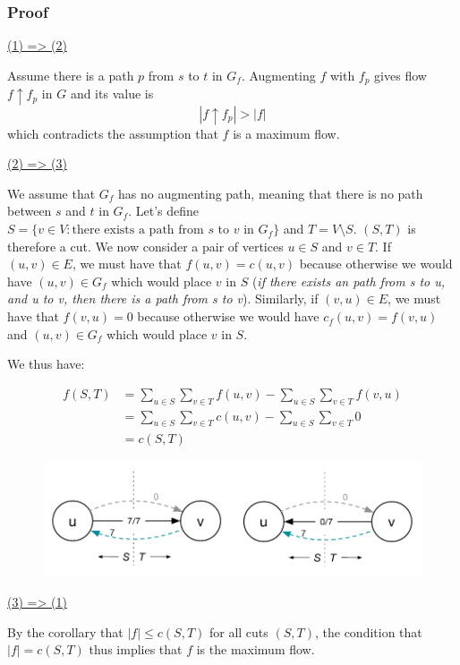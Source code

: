 \documentclass[12pt]{article}
\begin{document}
\subsubsection*{\color{red}Proof}

\underline{(1) => (2)}

Assume there is a path $p$ from $s$ to $t$ in $G_f$. Augmenting $f$ with $f_p$ gives flow $f \uparrow f_p$ in $G$ and its value is $$|f \uparrow f_p| > |f|$$ which contradicts the assumption that $f$ is a maximum flow.

\underline{(2) => (3)}

We assume that $G_f$ has no augmenting path, meaning that there is no path between $s$ and $t$ in $G_f$. Let's define $S = \{v \in V : \text{there exists a path from } s \text{ to } v \text{ in } G_f\}$ and $T = V \setminus S$. $(S,T)$ is therefore a cut. We now consider a pair of vertices $u \in S$ and $v \in T$. If $(u,v) \in E$, we must have that $f(u,v) = c(u,v)$ because otherwise we would have $(u,v) \in G_f$ which would place $v$ in $S$ (\textit{if there exists an path from s to u, and u to v, then there is a path from s to v}). Similarly, if $(v,u) \in E$, we must have that $f(v,u) = 0$ because otherwise we would have $c_f(u,v) = f(v,u)$ and $(u,v) \in G_f$ which would place $v$ in $S$.

We thus have:

\begin{align*}
  f(S,T) &=  \sum_{u \in S}\sum_{v \in T} f(u, v) -  \sum_{u \in S}\sum_{v \in T} f(v, u)\\
         &=  \sum_{u \in S}\sum_{v \in T} c(u, v) -  \sum_{u \in S}\sum_{v \in T} 0\\
         &=  c(S,T)
\end{align*}

\begin{figure}[h!]
  \centering
    \includegraphics[width=1\textwidth]{figures/6}
\end{figure}

\underline{(3) => (1)}

By the corollary that $|f| \leq c(S,T)$ for all cuts $(S,T)$, the condition that $|f| = c(S,T)$ thus implies that $f$ is the maximum flow. 
\end{document}
